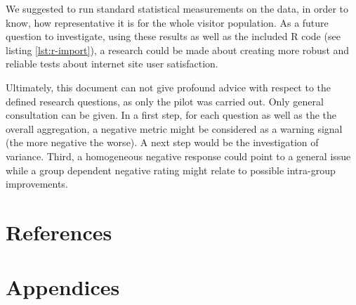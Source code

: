 \documentclass[12pt,a4paper,paper=a4,oneside,titlepage,pdftex]{scrartcl}
\begin{document}
We suggested to run standard statistical measurements on the data, in order to know, how representative it is for the whole visitor population. As a future question to investigate, using these results as well as the included R code (see listing \ref{lst:r-import}), a research could be made about creating more robust and reliable tests about internet site user satisfaction.

Ultimately, this document can not give profound advice with respect to the defined research questions, as only the pilot was carried out. Only general consultation can be given. In a first step, for each question as well as the the overall aggregation, a negative metric might be considered as a warning signal (the more negative the worse). A next step would be the investigation of variance. Third, a homogeneous negative response could point to a general issue while a group dependent negative rating might relate to possible intra-group improvements.


\section*{References}

\renewcommand\refname{\vskip -1cm}


\section{Appendices}
\end{document}
